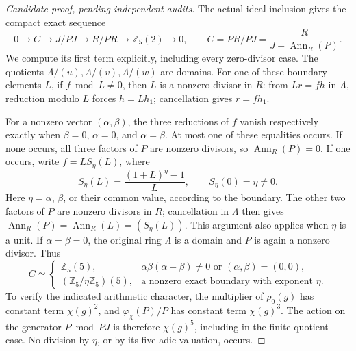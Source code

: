 \begin{proof}[Candidate proof, pending independent audits]
The actual ideal inclusion gives the compact exact sequence
\[
 0\longrightarrow C\longrightarrow J/PJ
       \longrightarrow R/PR\longrightarrow\mathbb Z_5(2)
       \longrightarrow0,\qquad
 C=PR/PJ=\frac{R}{J+\operatorname{Ann}_R(P)}.
                                                               \tag{D.81.13}
\]
We compute its first term explicitly, including every zero-divisor case.
The quotients \(\Lambda/(u),\Lambda/(v),\Lambda/(w)\) are domains.
For one of these boundary elements \(L\), if \(f\bmod L\ne0\),
then \(L\) is a nonzero divisor in \(R\): from \(Lr=fh\) in
\(\Lambda\), reduction modulo \(L\) forces \(h=Lh_1\);
cancellation gives \(r=fh_1\).

For a nonzero vector \((\alpha,\beta)\), the three reductions
of \(f\) vanish respectively exactly when
\(\beta=0\), \(\alpha=0\), and \(\alpha=\beta\).
At most one of these equalities occurs. If none occurs, all
three factors of \(P\) are nonzero divisors, so
\(\operatorname{Ann}_R(P)=0\). If one occurs, write
\(f=L S_\eta(L)\), where
\[
 S_\eta(L)=\frac{(1+L)^\eta-1}{L},\qquad S_\eta(0)=\eta\ne0.
 \]
Here \(\eta=\alpha\), \(\beta\), or their common value,
according to the boundary. The other two factors of \(P\)
are nonzero divisors in \(R\); cancellation in \(\Lambda\)
then gives
\(\operatorname{Ann}_R(P)=\operatorname{Ann}_R(L)=(S_\eta(L))\).
This argument also applies when \(\eta\) is a unit.
If \(\alpha=\beta=0\), the original ring \(\Lambda\) is a
domain and \(P\) is again a nonzero divisor. Thus
\[
 C\simeq
 \begin{cases}
  \mathbb Z_5(5),&
       \alpha\beta(\alpha-\beta)\ne0
                     \text{ or }(\alpha,\beta)=(0,0),\\
  (\mathbb Z_5/\eta\mathbb Z_5)(5),&
       \text{a nonzero exact boundary with exponent }\eta .
 \end{cases}                                                 \tag{D.81.14}
\]
To verify the indicated arithmetic character, the multiplier
of \(\rho_0(g)\) has constant term \(\chi(g)^2\), and
\(\varphi_\chi(P)/P\) has constant term \(\chi(g)^3\).
The action on the generator \(P\bmod PJ\) is therefore
\(\chi(g)^5\), including in the finite quotient case.
No division by \(\eta\), or by its five-adic valuation, occurs.


\end{proof}

